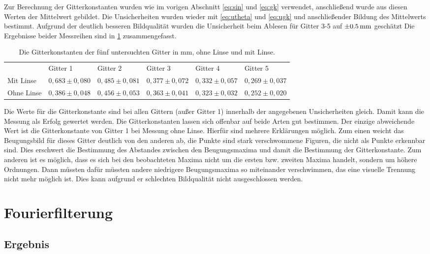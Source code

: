Zur Berechnung der Gitterkonstanten wurden wie im vorigen Abschnitt \cref{eq:sin} und \cref{eq:gk} verwendet, anschließend wurde aus diesen Werten der Mittelwert gebildet. Die Unsicherheiten wurden wieder mit \cref{eq:utheta} und \cref{eq:ugk} und anschließender Bildung des Mittelwerts bestimmt. Aufgrund der deutlich besseren Bildqualität wurden die Unsicherheit beim Ablesen für Gitter 3-5 auf $\SI{\pm0,5}{mm}$ geschätzt Die Ergebnisse beider Messreihen sind in \cref{tab2} zusammengefasst.

\begin{table}[h]
	\caption{Die Gitterkonstanten der fünf untersuchten Gitter in mm, ohne Linse und mit Linse.}
	\begin{tabular}{llllll}
		&Gitter 1 & Gitter 2& Gitter 3& Gitter 4& Gitter 5\\
		Mit Linse&$0,683\pm0,080$ & $0,485\pm0,081$ & $0,377\pm0,072$ & $0,332\pm0,057$ & $0,269\pm0,037$\\
		Ohne Linse&$0,386\pm0,048$ & $0,456\pm0,053$ & $0,363\pm0,041$ & $0,323\pm0,032$ & $0,252\pm0,020$
	\end{tabular}
	\label{tab2}
\end{table}

Die Werte für die Gitterkonstante sind bei allen Gittern (außer Gitter 1) innerhalb der angegebenen Unsicherheiten gleich. Damit kann die Messung als Erfolg gewertet werden. Die Gitterkonstanten lassen sich offenbar auf beide Arten gut bestimmen. Der einzige abweichende Wert ist die Gitterkonstante von Gitter 1 bei Messung ohne Linse. Hierfür sind mehrere Erklärungen möglich. Zum einen weicht das Beugungsbild für dieses Gitter deutlich von den anderen ab, die Punkte sind stark verschwommene Figuren, die nicht als Punkte erkennbar sind. Dies erschwert die Bestimmung des Abstandes zwischen den Beugungsmaxima und damit die Bestimmung der Gitterkonstante. Zum anderen ist es möglich, dass es sich bei den beobachteten Maxima nicht um die ersten bzw. zweiten Maxima handelt, sondern um höhere Ordnungen. Dann müssten dafür müssten andere niedrigere Beugungsmaxima so miteinander verschwimmen, das eine visuelle Trennung nicht mehr möglich ist. Dies kann aufgrund er schlechten Bildqualität nicht ausgeschlossen werden.

\section{Fourierfilterung}
\subsection{Ergebnis}
